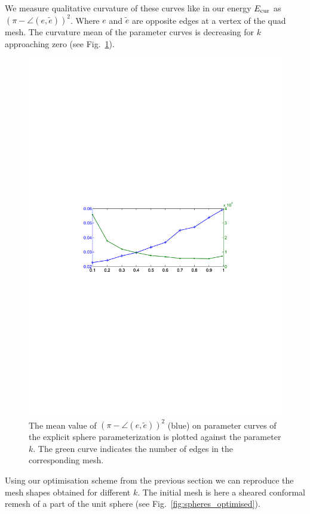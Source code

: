 We measure qualitative curvature of these curves like in our energy $E_{\textrm{\scriptsize{cur}}}$ as $(\pi - \angle(e,\tilde e))^2$. Where $e$ and $\tilde e$ are opposite edges at a vertex of the quad mesh. The curvature mean of the parameter curves is decreasing for $k$ approaching zero (see Fig.~\ref{fig:curvature_plot}).
\begin{figure}[hb]
\centering
\includegraphics[width=0.7\linewidth]{images/spheres/curvature2_embedded.pdf}
\caption{The mean value of $(\pi - \angle(e,\tilde e))^2$ (blue) on parameter curves of the explicit sphere parameterization is plotted against the parameter $k$. The green curve indicates the number of edges in the corresponding mesh.}
\label{fig:curvature_plot}
\end{figure}
Using our optimisation scheme from the previous section we can reproduce the mesh shapes obtained for different $k$. The initial mesh is here a sheared conformal remesh of a part of the unit sphere (see Fig.~\ref{fig:spheres_optimised}).
